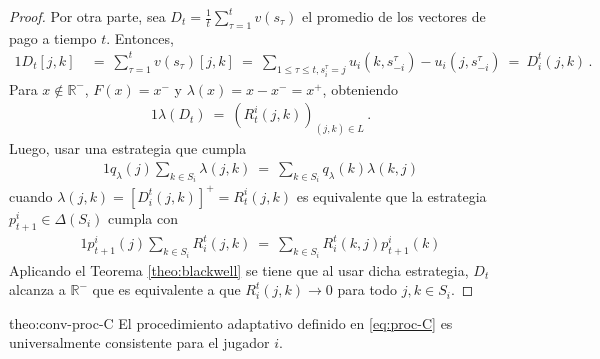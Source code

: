 \begin{proof}
Por otra parte, sea $D_t=\frac{1}{t}\sum_{\tau=1}^t v(s_\tau)$ el promedio de los vectores de pago a tiempo $t$. Entonces,
\begin{alignat}{1}
  D_t[j, k]\ &=\ \sum_{\tau=1}^{t} v(s_{\tau})[j,k]\
	=\ \sum_{1\leq\tau \leq t, s_i^{\tau} = j} u_i(k, s_{-i}^{\tau}) - u_i(j, s_{-i}^{\tau})\
	=\ D_i^t(j, k) \,.
\end{alignat}
Para $x \notin \mathbb{R}^-$, $F(x) = x^-$ y $\lambda (x) = x - x^- = x^+$, obteniendo 
\begin{alignat}{1}
	\lambda(D_t)\ =\ (R_t^i(j, k))_{(j, k) \in L} \,.
\end{alignat}
Luego, usar una estrategia que cumpla
\begin{alignat}{1}
	q_{\lambda}(j) \sum_{k \in S_i} \lambda(j, k)\ =\  \sum_{k \in S_i} q_{\lambda}(k) \lambda(k, j)
\end{alignat}
cuando $\lambda(j, k) = [D_i^t(j, k)]^+ = R_t^i(j, k)$ es equivalente que la estrategia $p_{t+1}^i \in \Delta(S_i)$ cumpla con
\begin{alignat}{1}
	p_{t+1}^i (j) \sum_{k \in S_i} R_i^t(j, k)\ =\ \sum_{k \in S_i} R_i^t(k, j) p_{t+1}^i(k)
\end{alignat}
Aplicando el Teorema \ref{theo:blackwell} se tiene que al usar dicha estrategia, $D_t$ alcanza a $\mathbb{R}^-$ que es equivalente a que $R_i^t(j, k) \rightarrow 0$ para todo $j, k \in S_i$.
\end{proof}

\begin{reptheorem}{theo:conv-proc-C}
El procedimiento adaptativo definido en \eqref{eq:proc-C} es universalmente consistente para el jugador $i$.
\end{reptheorem}

